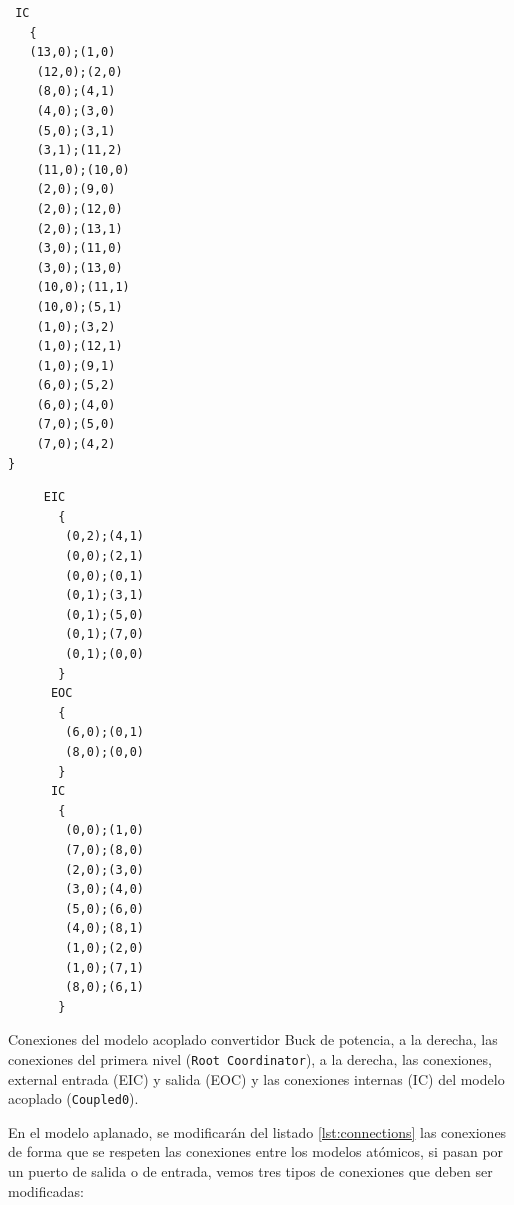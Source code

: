 \begin{listing}
\begin{minipage}[t]{0.5\linewidth}
\centering
\begin{verbatim}
 IC
   {
   (13,0);(1,0)
    (12,0);(2,0)
    (8,0);(4,1)
    (4,0);(3,0)
    (5,0);(3,1)
    (3,1);(11,2)
    (11,0);(10,0)
    (2,0);(9,0)
    (2,0);(12,0)
    (2,0);(13,1)
    (3,0);(11,0)
    (3,0);(13,0)
    (10,0);(11,1)
    (10,0);(5,1)
    (1,0);(3,2)
    (1,0);(12,1)
    (1,0);(9,1)
    (6,0);(5,2)
    (6,0);(4,0)
    (7,0);(5,0)
    (7,0);(4,2)
}
\end{verbatim}
\end{minipage}
\begin{minipage}[t]{0.5\linewidth}
\begin{verbatim}
     EIC
       {
        (0,2);(4,1)
        (0,0);(2,1)
        (0,0);(0,1)
        (0,1);(3,1)
        (0,1);(5,0)
        (0,1);(7,0)
        (0,1);(0,0)
       }
      EOC
       {
        (6,0);(0,1)
        (8,0);(0,0)
       }
      IC
       {
        (0,0);(1,0)
        (7,0);(8,0)
        (2,0);(3,0)
        (3,0);(4,0)
        (5,0);(6,0)
        (4,0);(8,1)
        (1,0);(2,0)
        (1,0);(7,1)
        (8,0);(6,1)
       }
\end{verbatim}
\end{minipage}
\label{lst:connections}
\caption{Conexiones del modelo acoplado convertidor Buck de potencia, a la derecha, las conexiones del primera nivel (\texttt{Root Coordinator}), a la derecha, 
        las conexiones, external entrada (EIC) y salida (EOC) y las conexiones internas (IC) del modelo acoplado (\texttt{Coupled0}).}
\end{listing}

        En el modelo aplanado, se modificarán del listado \ref{lst:connections} las conexiones de forma que se respeten las conexiones entre los modelos atómicos, 
	si pasan por un puerto de salida o de entrada, vemos tres tipos de conexiones que deben ser modificadas:

